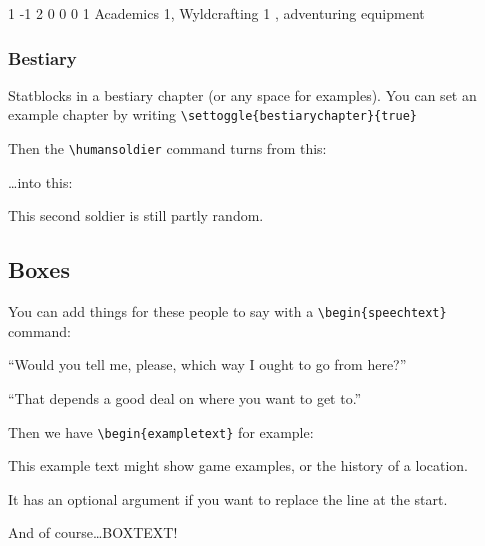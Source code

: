 \documentclass[a4paper,openany]{book}
\begin{document}
\begin{multicols}{2}
\begin{verbatim}
\end{verbatim}


{1}%
{-1}%
{{2}%
{0}%
{0}}%
{0}%
{1}%
{Academics 1, Wyldcrafting 1}%
{\longsword, adventuring equipment}%
{}

\subsubsection{Bestiary}

Statblocks in a bestiary chapter (or any space for examples).
You can set an example chapter by writing \verb"\settoggle{bestiarychapter}{true}"

Then the \verb"\humansoldier" command turns from this:

\humansoldier

\ldots into this:


\humansoldier

This second soldier is still partly random.

\subsection{Boxes}

You can add things for these people to say with a \verb"\begin{speechtext}" command:

\begin{speechtext}

  ``Would you tell me, please, which way I ought to go from here?''

  ``That depends a good deal on where you want to get to.''

\end{speechtext}

Then we have \verb"\begin{exampletext}" for example:

\begin{exampletext}
  This example text might show game examples, or the history of a location.

  It has an optional argument if you want to replace the line at the start.

\end{exampletext}

\begin{boxtext}
  And of course\ldots BOXTEXT!


\end{boxtext}
\end{multicols}
\end{document}
